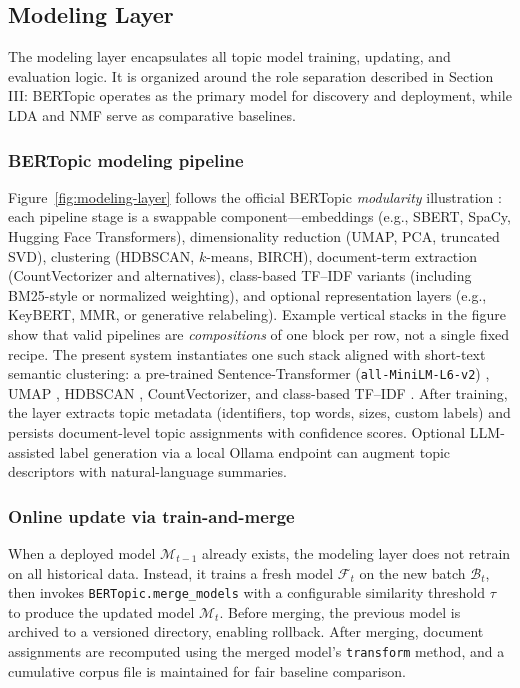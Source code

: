 \documentclass[conference]{IEEEtran}
\newcommand{\bertopic}{BERTopic\xspace}
\newcommand{\lda}{LDA\xspace}
\newcommand{\nmf}{NMF\xspace}
\begin{document}
\subsection{Modeling Layer}
The modeling layer encapsulates all topic model training, updating, and evaluation logic. It is organized around the role separation described in Section III: \bertopic operates as the primary model for discovery and deployment, while \lda and \nmf serve as comparative baselines.

\subsubsection{BERTopic modeling pipeline}
Figure~\ref{fig:modeling-layer} follows the official BERTopic \emph{modularity} illustration \cite{bertopic}: each pipeline stage is a swappable component---embeddings (e.g., SBERT, SpaCy, Hugging Face Transformers), dimensionality reduction (UMAP, PCA, truncated SVD), clustering (HDBSCAN, $k$-means, BIRCH), document-term extraction (CountVectorizer and alternatives), class-based TF--IDF variants (including BM25-style or normalized weighting), and optional representation layers (e.g., KeyBERT, MMR, or generative relabeling). Example vertical stacks in the figure show that valid pipelines are \emph{compositions} of one block per row, not a single fixed recipe. The present system instantiates one such stack aligned with short-text semantic clustering: a pre-trained Sentence-Transformer (\texttt{all-MiniLM-L6-v2}) \cite{sentencetransformers}, UMAP \cite{umap}, HDBSCAN \cite{hdbscan}, CountVectorizer, and class-based TF--IDF \cite{bertopic}. After training, the layer extracts topic metadata (identifiers, top words, sizes, custom labels) and persists document-level topic assignments with confidence scores. Optional LLM-assisted label generation via a local Ollama endpoint can augment topic descriptors with natural-language summaries.

\subsubsection{Online update via train-and-merge}
When a deployed model $\mathcal{M}_{t-1}$ already exists, the modeling layer does not retrain on all historical data. Instead, it trains a fresh model $\mathcal{F}_t$ on the new batch $\mathcal{B}_t$, then invokes \texttt{BERTopic.merge\_models} with a configurable similarity threshold $\tau$ to produce the updated model $\mathcal{M}_t$. Before merging, the previous model is archived to a versioned directory, enabling rollback. After merging, document assignments are recomputed using the merged model's \texttt{transform} method, and a cumulative corpus file is maintained for fair baseline comparison.
\end{document}
